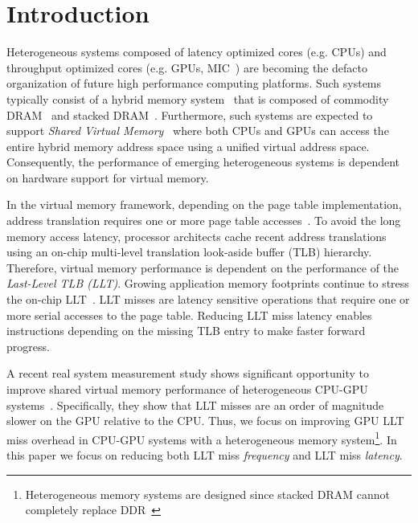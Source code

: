 
\section{Introduction}

\noindent Heterogeneous systems composed of latency optimized cores
(e.g. CPUs) and throughput optimized cores (e.g. GPUs, MIC~\cite{MIC})
are becoming the defacto organization of future high performance
computing platforms. Such systems typically consist of a hybrid memory
system~\cite{hbm_intel,hbm_amd,hbm_nvidia} that is composed of
commodity DRAM~\cite{ddr4-spec} and stacked
DRAM~\cite{hbm-spec,hmc_spec}. Furthermore, such systems are expected
to support {\em Shared Virtual Memory}~\cite{HSA,UVM} where both CPUs
and GPUs can access the entire hybrid memory address space using a
unified virtual address space. Consequently, the performance of
emerging heterogeneous systems is dependent on hardware support for
virtual memory.

In the virtual memory framework, depending on the page table
implementation, address translation requires one or more page table
accesses~\cite{Bhargava2008}. To avoid the long memory access latency,
processor architects cache recent address translations using an
on-chip multi-level translation look-aside buffer (TLB) hierarchy.
Therefore, virtual memory performance is dependent on the performance
of the {\em Last-Level TLB (LLT)}. Growing application memory
footprints continue to stress the on-chip LLT~\cite{spectlb, Basu2013,
SharedLLT, COLT}. LLT misses are latency sensitive operations that
require one or more serial accesses to the page table. Reducing LLT
miss latency enables instructions depending on the missing TLB entry
to make faster forward progress.

A recent real system measurement study shows significant opportunity
to improve shared virtual memory performance of heterogeneous CPU-GPU
systems~\cite{vesley2016ispass}. Specifically, they show that LLT
misses are an order of magnitude slower on the GPU relative to the
CPU. Thus, we focus on improving GPU LLT miss overhead in CPU-GPU
systems with a heterogeneous memory system\footnote{Heterogeneous
memory systems are designed since stacked DRAM cannot completely
replace DDR~\cite{BEAR,moin2012}}. 
In this paper we focus on reducing both LLT miss {\em frequency} and
LLT miss {\em latency}.


